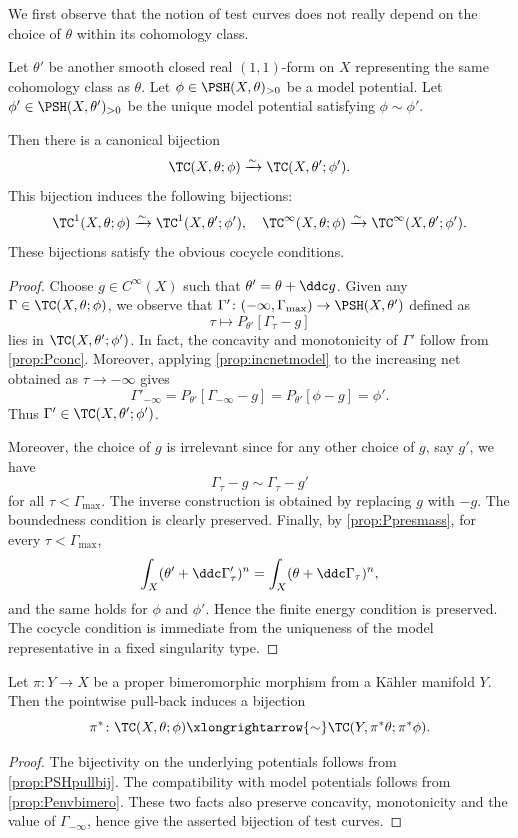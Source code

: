 We first observe that the notion of test curves does not really depend on the choice of $\theta$ within its cohomology class.
\begin{proposition}\label{prop:testcurveindeptheta}
    Let $\theta'$ be another smooth closed real $(1,1)$-form on $X$ representing the same cohomology class as $\theta$. Let $\phi\in \PSH(X,\theta)_{>0}$ be a model potential. Let $\phi'\in \PSH(X,\theta')_{>0}$ be the unique model potential satisfying $\phi\sim\phi'$.

    Then there is a canonical bijection
    \[
    \TC(X,\theta;\phi)\xrightarrow{\sim} \TC(X,\theta';\phi').
    \]
    This bijection induces the following bijections:
    \[
    \TC^1(X,\theta;\phi)\xrightarrow{\sim}\TC^1(X,\theta';\phi'),\quad \TC^{\infty}(X,\theta;\phi)\xrightarrow{\sim}\TC^{\infty}(X,\theta';\phi').
    \]
    These bijections satisfy the obvious cocycle conditions.
\end{proposition}
\begin{proof}
    Choose $g\in C^{\infty}(X)$ such that $\theta'=\theta+\ddc g$. Given any $\Gamma\in \TC(X,\theta;\phi)$, we observe that $\Gamma'\colon (-\infty,\Gamma_{\max})\rightarrow \PSH(X,\theta')$ defined as
    \[
    \tau\mapsto P_{\theta'}[\Gamma_{\tau}-g]
    \]
    lies in $\TC(X,\theta';\phi')$. In fact, the concavity and monotonicity of $\Gamma'$ follow from \cref{prop:Pconc}. Moreover, applying \cref{prop:incnetmodel} to the increasing net obtained as $\tau\to -\infty$ gives
    \[
        \Gamma'_{-\infty}=P_{\theta'}[\Gamma_{-\infty}-g]=P_{\theta'}[\phi-g]=\phi'.
    \]
    Thus $\Gamma'\in \TC(X,\theta';\phi')$.
    
    Moreover, the choice of $g$ is irrelevant since for any other choice of $g$, say $g'$, we have
    \[
    \Gamma_{\tau}-g\sim \Gamma_{\tau}-g'
    \]
    for all $\tau<\Gamma_{\max}$. The inverse construction is obtained by replacing $g$ with $-g$. The boundedness condition is clearly preserved. Finally, by \cref{prop:Ppresmass}, for every $\tau<\Gamma_{\max}$,
    \[
        \int_X(\theta'+\ddc \Gamma'_\tau)^n=\int_X(\theta+\ddc \Gamma_\tau)^n,
    \]
    and the same holds for $\phi$ and $\phi'$. Hence the finite energy condition is preserved. The cocycle condition is immediate from the uniqueness of the model representative in a fixed singularity type.
\end{proof}


\begin{proposition}\label{prop:ETCbimero}
    Let $\pi\colon Y\rightarrow X$ be a proper bimeromorphic morphism from a K\"ahler manifold $Y$. Then the pointwise pull-back induces a bijection
    \[
    \pi^*\colon \TC(X,\theta;\phi)\xlongrightarrow{\sim} \TC(Y,\pi^*\theta;\pi^*\phi).
    \]
\end{proposition}
\begin{proof}
     The bijectivity on the underlying potentials follows from \cref{prop:PSHpullbij}. The compatibility with model potentials follows from \cref{prop:Penvbimero}. These two facts also preserve concavity, monotonicity and the value of $\Gamma_{-\infty}$, hence give the asserted bijection of test curves.
\end{proof}

